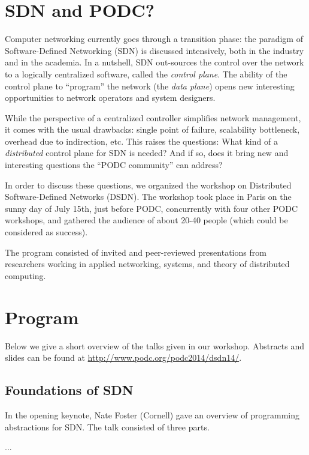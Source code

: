 \documentclass[11pt,pdftex,letter]{article}
\begin{document}
\section{SDN and PODC?}

Computer networking currently goes through a transition phase:
the paradigm of Software-Defined Networking (SDN)
is discussed intensively, both in the industry and in the academia. In
a nutshell, SDN out-sources the control over the network 
to a logically centralized software, called the \emph{control plane}. 
The ability of the control plane to ``program'' the network (the
\emph{data plane}) opens new interesting opportunities to network
operators and system designers.

 While the perspective of a centralized controller simplifies network management,
it comes with the usual drawbacks: single point of failure,
scalability bottleneck, overhead due to indirection, etc. 
This raises the questions: What kind of a \emph{distributed} control
plane for SDN is needed? 
And if so, does it bring new and interesting questions the ``PODC
community'' can address?

In order to discuss these questions, we organized the workshop on Distributed
Software-Defined Networks (DSDN). The workshop took
place in Paris on the sunny day of July 15th, just before
PODC, concurrently with four other PODC workshops, and gathered the
audience of about 20-40 people (which could be considered as success). 

The program consisted of invited and peer-reviewed presentations from researchers working in applied networking,
systems, and theory of distributed computing.


\section{Program}

Below we give a short overview of the talks given in our
workshop. Abstracts and slides can be found at \url{http://www.podc.org/podc2014/dsdn14/}. 

\subsection{Foundations of SDN}

In the opening keynote, Nate Foster (Cornell) gave an overview of
programming abstractions for SDN. The talk consisted of three parts. 

... 
\end{document}
